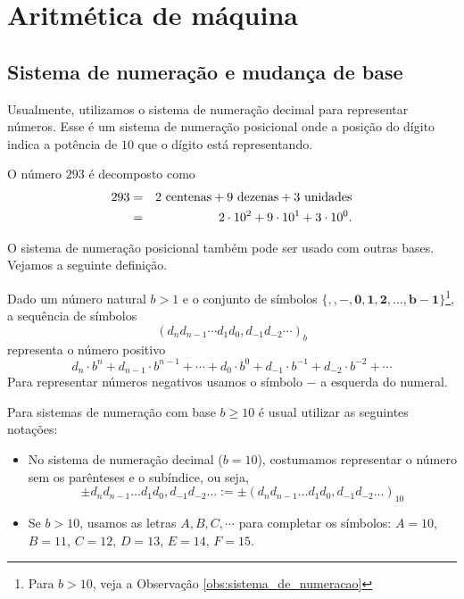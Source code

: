 \documentclass[main.tex]{subfiles}
\begin{document}
\chapter{Aritmética de máquina}

\section{Sistema de numeração e mudança de base}
Usualmente, utilizamos o sistema de numeração decimal para representar números. Esse é um sistema de numeração posicional onde a posição do dígito indica a potência de $10$ que o dígito está representando.

\begin{ex}
  O número $293$ é decomposto como
  \begin{eqnarray*}
    293&=&2\ \hbox{centenas}+9\ \hbox{dezenas}+3\ \hbox{unidades}\\
    &=&2\cdot 10^2+9\cdot 10^1+3\cdot 10^0.
  \end{eqnarray*}
\end{ex}

O sistema de numeração posicional também pode ser usado com outras bases. Vejamos a seguinte definição.

\begin{defn}\label{def:sistema_de_numeração}
Dado um número natural $b>1$ e o conjunto de símbolos $\{\pmb{,}, \pmb{-},  \pmb{0}, \pmb{1}, \pmb{2},\dotsc, \pmb{b-1}\}$\footnote{Para $b>10$, veja a Observação \ref{obs:sistema_de_numeracao}}, a sequência de símbolos
\begin{equation*}
\left(d_nd_{n-1} \cdots d_1d_0,d_{-1}d_{-2} \cdots \right)_b  
\end{equation*}
representa o número positivo
\begin{equation*}
 d_n\cdot b^n + d_{n-1}\cdot b^{n-1} + \cdots + d_0\cdot b^0 + d_{-1}\cdot b^{-1}+d_{-2}\cdot b^{-2} + \cdots
\end{equation*}
Para representar números negativos usamos o símbolo $-$ a esquerda do numeral.
\end{defn}

\begin{obs}[$b\geq 10$]\label{obs:sistema_de_numeracao}
Para sistemas de numeração com base $b \geq 10$ é usual utilizar as seguintes notações:
\begin{itemize}
\item No sistema de numeração decimal ($b=10$), costumamos representar o número sem os parênteses e o subíndice, ou seja,
\begin{equation*}
  \pm d_nd_{n-1}\ldots d_1d_0,d_{-1}d_{-2}\ldots := \pm (d_nd_{n-1}\ldots d_1d_0,d_{-1}d_{-2}\ldots)_{10}  
\end{equation*}
\item Se $b>10$, usamos as letras $A, B, C, \cdots$ para completar os símbolos: $A=10$, $B=11$, $C=12$, $D=13$, $E=14$, $F=15$.
\end{itemize}
\end{obs}
\end{document}

